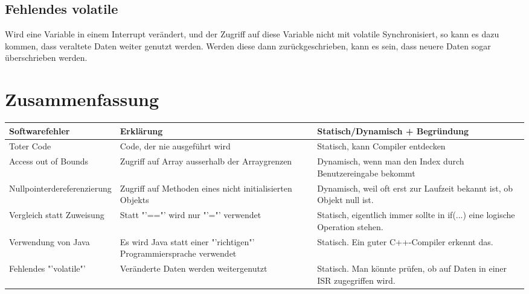 \documentclass[ngerman]{scrartcl}
\begin{document}
\subsection{Fehlendes volatile}
Wird eine Variable in einem Interrupt verändert, und der Zugriff auf diese Variable nicht mit volatile Synchronisiert, so kann es dazu kommen, dass veraltete Daten weiter genutzt werden. Werden diese dann zurückgeschrieben, kann es sein, dass neuere Daten sogar überschrieben werden.

\section{Zusammenfassung}

\begin{tabular}{|p{3cm}|p{5cm}|p{6cm}|}
	\hline
	\textbf{Softwarefehler} & \textbf{Erklärung} & \textbf{Statisch/Dynamisch + Begründung} \\
	\hline
	Toter Code & Code, der nie ausgeführt wird & Statisch, kann Compiler entdecken \\
	\hline
	Access out of Bounds & Zugriff auf Array ausserhalb der Arraygrenzen & Dynamisch, wenn man den Index durch Benutzereingabe bekommt \\
	\hline
	Nullpointerdereferenzierung & Zugriff auf Methoden eines nicht initialisierten Objekts & Dynamisch, weil oft erst zur Laufzeit bekannt ist, ob Objekt null ist. \\
	\hline
	Vergleich statt Zuweisung & Statt "'=="' wird nur "'="' verwendet & Statisch, eigentlich immer sollte in if(...) eine logische Operation stehen. \\
	\hline
	Verwendung von Java & Es wird Java statt einer "'richtigen"' Programmiersprache verwendet & Statisch. Ein guter C++-Compiler erkennt das. \\
	\hline
	Fehlendes "'volatile"' & Veränderte Daten werden weitergenutzt & Statisch. Man könnte prüfen, ob auf Daten in einer ISR zugegriffen wird. \\
	\hline
\end{tabular}
\end{document}
